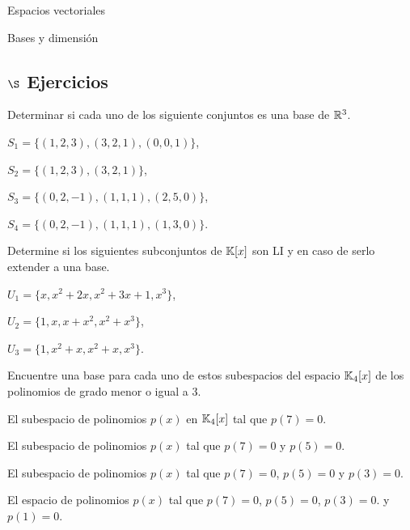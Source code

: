 \begin{chapter}{Espacios vectoriales}
\begin{section}{Bases y dimensi\'on}
    \subsection*{$\S$ Ejercicios}
    \begin{enumex}
        \item Determinar si cada uno de los siguiente conjuntos es una base de $\mathbb R^3$.
            \begin{enumex}
                \item $S_1 = \{(1,2,3),(3,2,1),(0,0,1)\}$,
                \item $S_2 = \{(1,2,3),(3,2,1)\}$,
                \item $S_3 = \{(0,2,-1),(1,1,1),(2,5,0)\}$,
                \item $S_4 = \{(0,2,-1),(1,1,1),(1,3,0)\}$.
            \end{enumex}
        \item  Determine si los siguientes subconjuntos de $\mathbb K[x]$  son LI y en caso de serlo extender a una base.
            \begin{enumex}
                \item $U_1 = \{x, x^2+2x, x^2+3x+1, x^3 \}$,
                \item $U_2 = \{1, x, x+x^2 , x^2+x^3 \}$,
                \item $U_3 = \{1, x^2+x, x^2+x, x^3 \}$.
            \end{enumex}
        \item Encuentre una base para cada uno de estos subespacios del espacio $\mathbb K_4[x]$ de los polinomios de grado menor o igual a $3$.
            \begin{enumex}
                \item El subespacio de polinomios $p (x)$ en $\mathbb K_4[x]$ tal que $p (7) = 0$.
                \item El subespacio de polinomios $p (x)$ tal que $p (7) = 0$ y $p (5) = 0$.
                \item El subespacio de polinomios $p (x)$ tal que $p (7) = 0$, $p (5) = 0$ y $p (3) = 0$.
                \item El espacio de polinomios $p (x)$ tal que $p (7) = 0$, $p (5) = 0$, $p (3) = 0$.
        y $p (1) = 0$.
            \end{enumex}
     

\end{enumex}
\end{section}
\end{chapter}
